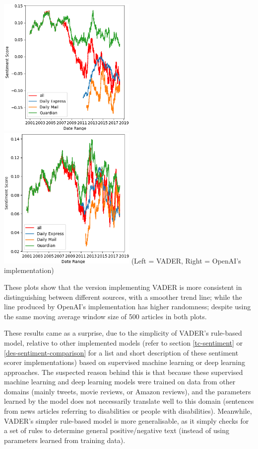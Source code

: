 \documentclass{report}
\begin{document}
\noindent
\includegraphics[width=0.5\textwidth]{vader.png}
\includegraphics[width=0.5\textwidth]{openai.png}
(Left = VADER, Right = OpenAI's implementation)
\vspace{0.5em}

These plots show that the version implementing VADER is more consistent in distinguishing between different sources, with a smoother trend line; while the line produced by OpenAI's implementation has higher randomness; despite using the same moving average window size of 500 articles in both plots.

These results came as a surprise, due to the simplicity of VADER's rule-based model, relative to other implemented models (refer to section \ref{tc-sentiment} or \ref{des-sentiment-comparison} for a list and short description of these sentiment scorer implementations) based on supervised machine learning or deep learning approaches.
The suspected reason behind this is that because these supervised machine learning and deep learning models were trained on data from other domains (mainly tweets, movie reviews, or Amazon reviews), and the parameters learned by the model does not necessarily translate well to this domain (sentences from news articles referring to disabilities or people with disabilities). 
Meanwhile, VADER's simpler rule-based model is more generalisable, as it simply checks for a set of rules to determine general positive/negative text (instead of using parameters learned from training data).
\end{document}
